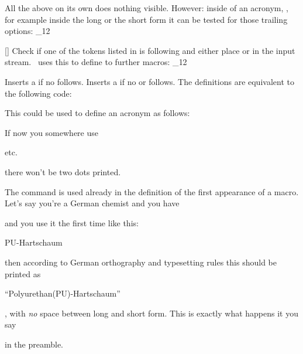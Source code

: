 \documentclass[load-preamble+]{cnltx-doc}
\makeatletter
\renewenvironment{commands}
  {%
    \cnltx@set@catcode_{12}%
    \let\command\cnltx@command
    \cnltxlist
  }
  {\endcnltxlist}
\makeatother
\begin{document}
All the above on its own does nothing visible. However: inside of an acronym,
\ie, for example inside the long or the short form it can be tested for those
trailing options:
\begin{commands}
  \command{aciftrailing}[]
    Check if one of the tokens listed in  is
    following and either place  or  in the input
    stream.
\end{commands}
\acro\ uses this to define to further macros:
\begin{commands}
  \command{acdot} Inserts a  if no  follows.
  \command{acspace} Inserts a  if no  or
     follows.
\end{commands}
The definitions are equivalent to the following code:
\begin{sourcecode}
  \newcommand*\acdot{\aciftrailing{dot}{}{.}}
  \newcommand*\acspace{\aciftrailing{dash,babel-hyphen}{}{\space}}
\end{sourcecode}

This could be used to define an acronym as follows:
\begin{sourcecode}
\end{sourcecode}
If now you somewhere use
\begin{sourcecode}
  \ac{etc}.
\end{sourcecode}
there won't be two dots printed.

The command  is used already in the definition of the first
appearance of a macro.  Let's say you're a German chemist and you have
\begin{sourcecode}
\end{sourcecode}
and you use it the first time like this:
\begin{sourcecode}
  \ac{PU}-Hartschaum
\end{sourcecode}
then according to German orthography and typesetting rules this should be
printed as
\begin{center}
  \enquote{Polyurethan(PU)-Hartschaum}
\end{center}
\ie, with \emph{no} space between long and short form.  This is exactly what
happens it you say
\begin{sourcecode}
\end{sourcecode}
in the preamble.
\end{document}
